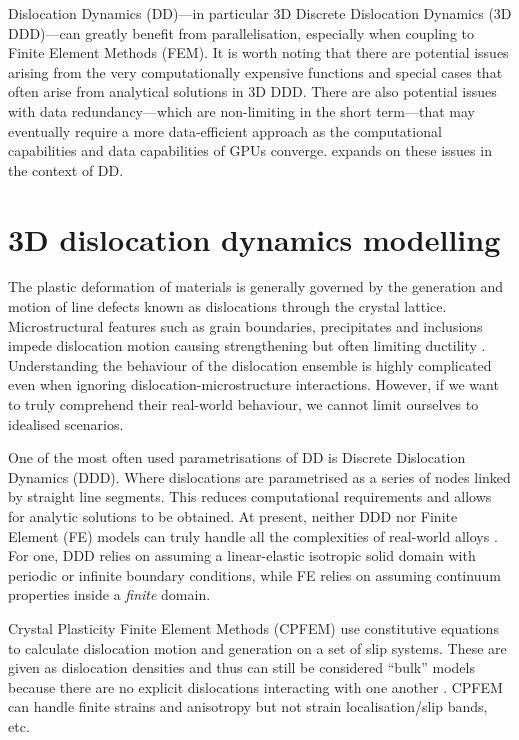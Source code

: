 Dislocation Dynamics (DD)---in particular 3D Discrete Dislocation Dynamics (3D DDD)---can greatly benefit from parallelisation, especially when coupling to Finite Element Methods (FEM). It is worth noting that there are potential issues arising from the very computationally expensive functions and special cases that often arise from analytical solutions in 3D DDD. There are also potential issues with data redundancy---which are non-limiting in the short term---that may eventually require a more data-efficient approach as the computational capabilities and data capabilities of GPUs converge.  expands on these issues in the context of DD.

\section{3D dislocation dynamics modelling}
\label{s:3d_ddd}

The plastic deformation of materials is generally governed by the generation and motion of line defects known as dislocations through the crystal lattice. Microstructural features such as grain boundaries, precipitates and inclusions impede dislocation motion causing strengthening but often limiting ductility \cite{init_fail_dln}. Understanding the behaviour of the dislocation ensemble is highly complicated even when ignoring dislocation-microstructure interactions. However, if we want to truly comprehend their real-world behaviour, we cannot limit ourselves to idealised scenarios.

One of the most often used parametrisations of DD is Discrete Dislocation Dynamics (DDD). Where dislocations are parametrised as a series of nodes linked by straight line segments. This reduces computational requirements and allows for analytic solutions to be obtained. At present, neither DDD nor Finite Element (FE) models can truly handle all the complexities of real-world alloys \cite{ddd_fem1, paradis, fem_ddd2, fem_ddd}. For one, DDD relies on assuming a linear-elastic isotropic solid domain with periodic or infinite boundary conditions, while FE relies on assuming continuum properties inside a \emph{finite} domain.

Crystal Plasticity Finite Element Methods (CPFEM) use constitutive equations to calculate dislocation motion and generation on a set of slip systems. These are given as dislocation densities and thus can still be considered ``bulk'' models because there are no explicit dislocations interacting with one another \cite{cpfem1}. CPFEM can handle finite strains and anisotropy but not strain localisation/slip bands, etc.

